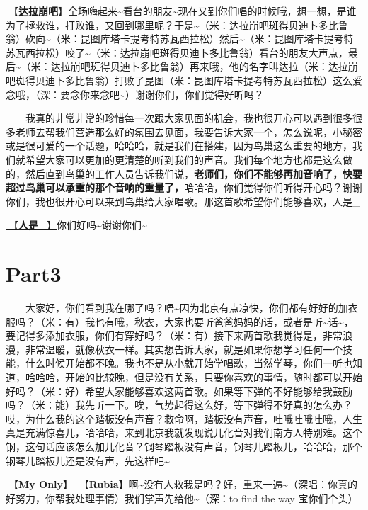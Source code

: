 \documentclass[]{ctexbook}
\begin{document}
\hyperref[dalabengba]{🎵【\textbf{达拉崩吧}】}全场嗨起来\textasciitilde 看台的朋友\textasciitilde 现在又到你们唱的时候哦，想一想，是谁为了拯救谁，打败谁，又回到哪里呢？于是\textasciitilde（米：达拉崩吧斑得贝迪卜多比鲁翁）砍向\textasciitilde（米：昆图库塔卡提考特苏瓦西拉松）然后\textasciitilde（米：昆图库塔卡提考特苏瓦西拉松）咬了\textasciitilde（米：达拉崩吧斑得贝迪卜多比鲁翁）看台的朋友大声点，最后\textasciitilde（米：达拉崩吧斑得贝迪卜多比鲁翁）再来哦，他的名字叫达拉（米：达拉崩吧斑得贝迪卜多比鲁翁）打败了昆图（米：昆图库塔卡提考特苏瓦西拉松）这么爱念哦，（深：要念你来念吧\textasciitilde）谢谢你们，你们觉得好听吗？

  我真的非常非常的珍惜每一次跟大家见面的机会，我也很开心可以遇到很多很多老师去帮我们营造那么好的氛围去见面，我要告诉大家一个，怎么说呢，小秘密或是很可爱的一个话题，哈哈哈，就是我们在搭建，因为鸟巢这么重要的地方，我们就希望大家可以更加的更清楚的听到我们的声音。我们每个地方也都是这么做的，然后直到鸟巢的工作人员告诉我们说，\textbf{老师们，你们不能够再加音响了，快要超过鸟巢可以承重的那个音响的重量了，}哈哈哈，你们觉得你们听得开心吗？谢谢你们，我也很开心可以来到鸟巢给大家唱歌。那这首歌希望你们能够喜欢，人是\_

\hyperref[renshi]{🎵【\textbf{人是\_}】}你们好吗\textasciitilde 谢谢你们\textasciitilde{}

\section{Part3}\label{beijing-20240921-part3}

  大家好，你们看到我在哪了吗？唔\textasciitilde 因为北京有点凉快，你们都有好好的加衣服吗？（米：有）我也有哦，秋衣，大家也要听爸爸妈妈的话，或者是听\textasciitilde 话\textasciitilde，要记得多添加衣服，你们有穿好吗？（米：有）接下来两首歌我觉得是，非常浪漫，非常温暖，就像秋衣一样。其实想告诉大家，就是如果你想学习任何一个技能，什么时候开始都不晚。我也不是从小就开始学唱歌，当然学琴，你们一听也知道，哈哈哈，开始的比较晚，但是没有关系，只要你喜欢的事情，随时都可以开始好吗？（米：好）希望大家能够喜欢这两首歌。如果等下弹的不好能够给我鼓励吗？（米：能）我先听一下。唉，气势起得这么好，等下弹得不好真的怎么办？哎，为什么我的这个踏板没有声音？救命啊，踏板没有声音，哇哦哇哦哇哦，人生真是充满惊喜儿，哈哈哈，来到北京我就发现说儿化音对我们南方人特别难。这个钢，这句话应该怎么加儿化音？钢琴踏板没有声音，钢琴儿踏板儿，哈哈哈，那个钢琴儿踏板儿还是没有声，先这样吧\textasciitilde{}

\hyperref[my-only]{🎵【\textbf{My Only}】} \hyperref[rubia]{🎵【\textbf{Rubia}】}啊\textasciitilde 没有人救我是吗？好，重来一遍\textasciitilde（深唱：你真的好努力，你帮我处理事情）我们掌声先给他\textasciitilde（深：to find the way 宝你们个头）
\end{document}

